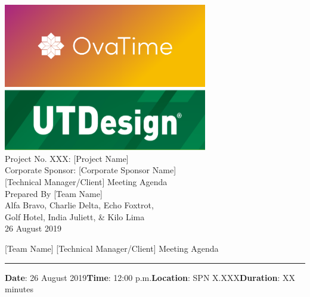 \documentclass[12pt]{article}
\newcommand{\Title}{[Technical Manager/Client] Meeting Agenda}
\newcommand{\Date}{26 August 2019}
\newcommand{\Time}{12:00 p.m.}
\newcommand{\Location}{SPN X.XXX}
\newcommand{\Duration}{XX minutes}
\begin{document}
\thispagestyle{empty}
\begin{center}
    \includegraphics[width=3.5in]{logos/team_logo.png} \\
    \vspace{6pt}
    \includegraphics[width=3.5in]{logos/utdesign_logo.png} \\
    \vspace{0.75in}
    \Large
    Project No. XXX: [Project Name] \\
    Corporate Sponsor: [Corporate Sponsor Name] \\
    \vspace{0.75in}
    \Huge \Title \\
    \vspace{0.75in}
    \Large Prepared By [Team Name] \\
    \vspace{12pt}
    \large Alfa Bravo, Charlie Delta, Echo Foxtrot,\\ Golf Hotel, India Juliett, \& Kilo Lima \\
    \vspace{0.5in}
    \Large \Date \\
\end{center}
\clearpage

\begin{center}
    {\Large [Team Name] \Title}
\end{center}
\hrule
\vspace{18pt}
\textbf{Date}: \Date \hfill \textbf{Time}: \Time \hfill \textbf{Location}: \Location \hfill \textbf{Duration}: \Duration
\end{document}
